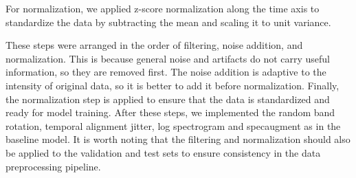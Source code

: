 For normalization, we applied z-score normalization along the time axis to 
standardize the data by subtracting the mean and scaling it to unit variance.

These steps were arranged in the order of filtering, noise addition, and normalization.
This is because general noise and artifacts do not carry useful information, so they are removed first.
The noise addition is adaptive to the intensity of original data, so it is better to add it before normalization.
Finally, the normalization step is applied to ensure that the data is standardized and ready for model training.
After these steps, we implemented the random band rotation, temporal alignment jitter, 
log spectrogram and specaugment as in the baseline model.
It is worth noting that the filtering and normalization should also be applied to the validation and test sets to ensure consistency in the data preprocessing pipeline.